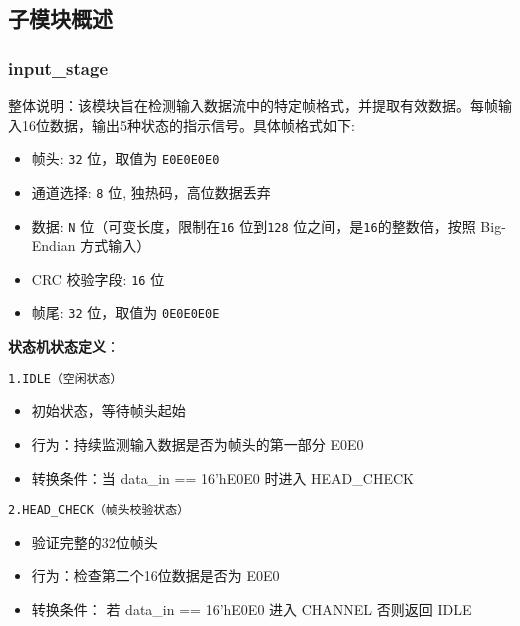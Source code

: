 \documentclass[12pt,]{article}
\begin{document}
\hypertarget{ux5b50ux6a21ux5757ux6982ux8ff0}{%
\subsection{子模块概述}\label{ux5b50ux6a21ux5757ux6982ux8ff0}}

\hypertarget{input_stage}{%
\subsubsection{input\_stage}\label{input_stage}}

整体说明：该模块旨在检测输入数据流中的特定帧格式，并提取有效数据。每帧输入16位数据，输出5种状态的指示信号。具体帧格式如下:

\begin{itemize}
\item
  帧头: \texttt{32} 位，取值为 \texttt{E0E0E0E0}
\item
  通道选择: \texttt{8} 位, 独热码，高位数据丢弃
\item
  数据: \texttt{N} 位（可变长度，限制在\texttt{16} 位到\texttt{128}
  位之间，是\texttt{16}的整数倍，按照 Big-Endian 方式输入）
\item
  CRC 校验字段: \texttt{16} 位
\item
  帧尾: \texttt{32} 位，取值为 \texttt{0E0E0E0E}
\end{itemize}

\textbf{状态机状态定义}：

\texttt{1.\hspace{0pt}IDLE\hspace{0pt}（空闲状态）}

\begin{itemize}
\item
  初始状态，等待帧头起始
\item
  行为：持续监测输入数据是否为帧头的第一部分 E0E0
\item
  转换条件：当 data\_in == 16'hE0E0 时进入 HEAD\_CHECK
\end{itemize}

\texttt{2.HEAD\_CHECK\hspace{0pt}（帧头校验状态）}

\begin{itemize}
\item
  验证完整的32位帧头
\item
  行为：检查第二个16位数据是否为 E0E0
\item
  转换条件： 若 data\_in == 16'hE0E0 进入 CHANNEL 否则返回 IDLE
\end{itemize}
\end{document}

